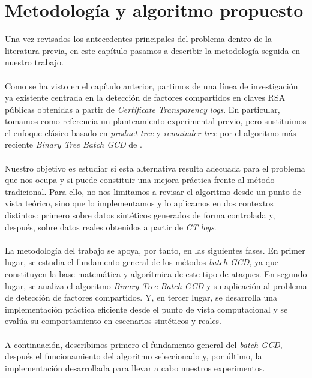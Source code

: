 \chapter{Metodología y algoritmo propuesto}

Una vez revisados los antecedentes principales del problema dentro de la literatura previa, en este capítulo pasamos a describir la metodología seguida en nuestro trabajo.
\\
\\
Como se ha visto en el capítulo anterior, partimos de una línea de investigación ya existente centrada en la detección de factores compartidos en claves RSA públicas obtenidas a partir de \textit{Certificate Transparency logs}. En particular, tomamos como referencia un planteamiento experimental previo, pero sustituimos el enfoque clásico basado en \textit{product tree} y \textit{remainder tree} por el algoritmo más reciente \textit{Binary Tree Batch GCD} de \cite{pelofske2024efficient}.
\\
\\
Nuestro objetivo es estudiar si esta alternativa resulta adecuada para el problema que nos ocupa y si puede constituir una mejora práctica frente al método tradicional. Para ello, no nos limitamos a revisar el algoritmo desde un punto de vista teórico, sino que lo implementamos y lo aplicamos en dos contextos distintos: primero sobre datos sintéticos generados de forma controlada y, después, sobre datos reales obtenidos a partir de \textit{CT logs}.
\\
\\
La metodología del trabajo se apoya, por tanto, en las siguientes fases. En primer lugar, se estudia el fundamento general de los métodos \textit{batch GCD}, ya que constituyen la base matemática y algorítmica de este tipo de ataques. En segundo lugar, se analiza el algoritmo \textit{Binary Tree Batch GCD} y su aplicación al problema de detección de factores compartidos. Y, en tercer lugar, se desarrolla una implementación práctica eficiente desde el punto de vista computacional y se evalúa su comportamiento en escenarios sintéticos y reales.
\\
\\
A continuación, describimos primero el fundamento general del \textit{batch GCD}, después el funcionamiento del algoritmo seleccionado y, por último, la implementación desarrollada para llevar a cabo nuestros experimentos.

